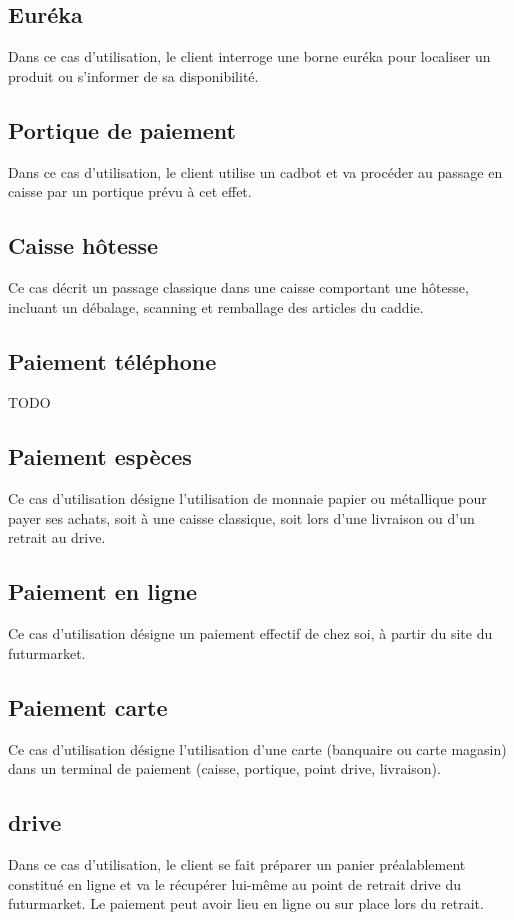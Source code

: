\subsection{Euréka}
Dans ce cas d'utilisation, le client interroge une borne euréka pour localiser un produit ou s'informer de sa disponibilité.

\subsection{Portique de paiement}
Dans ce cas d'utilisation, le client utilise un cadbot et va procéder au passage en caisse par un portique prévu à cet effet. 

\subsection{Caisse hôtesse}
Ce cas décrit un passage classique dans une caisse comportant une hôtesse, incluant un débalage, scanning et remballage des articles du caddie.

\subsection{Paiement téléphone}
TODO

\subsection{Paiement espèces}
Ce cas d'utilisation désigne l'utilisation de monnaie papier ou métallique pour payer ses achats, soit à une caisse classique, soit lors d'une livraison ou d'un retrait au drive.

\subsection{Paiement en ligne}
Ce cas d'utilisation désigne un paiement effectif de chez soi, à partir du site du futurmarket.

\subsection{Paiement carte}
Ce cas d'utilisation désigne l'utilisation d'une carte (banquaire ou carte magasin) dans un terminal de paiement (caisse, portique, point drive, livraison).

\subsection{drive}
Dans ce cas d'utilisation, le client se fait préparer un panier préalablement constitué en ligne et va le récupérer lui-même au point de retrait drive du futurmarket.
Le paiement peut avoir lieu en ligne ou sur place lors du retrait.

